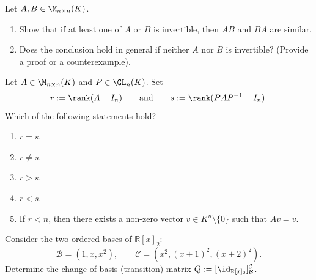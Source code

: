 \begin{exercise}
\label{exc:similarity_of_matrix_products}
Let $A, B \in \M_{n \times n}(K)$.
\begin{enumerate}
    \item Show that if at least one of $A$ or $B$ is invertible, then $AB$ and $BA$ are similar.
    \item Does the conclusion hold in general if neither $A$ nor $B$ is invertible? (Provide a proof or a counterexample).
\end{enumerate}
\end{exercise}

\begin{exercise}
\label{exc:rank_invariance_similarity_mc}
Let $A \in \M_{n \times n}(K)$ and $P \in \GL_n(K)$. Set
\[
r := \rank(A - I_n) \qquad \text{and} \qquad s := \rank(P A P^{-1} - I_n).
\]
Which of the following statements hold?
\begin{enumerate}[label=\textbf{(\alph*)}]
    \item $r = s$.
    \item $r \ne s$.
    \item $r > s$.
    \item $r < s$.
    \item If $r < n$, then there exists a non-zero vector $v \in K^n \setminus \{0\}$ such that $Av = v$.
\end{enumerate}
\end{exercise}

\begin{exercise}
\label{exc:change_of_basis_polynomials_mc}
Consider the two ordered bases of $\mathbb{R}[x]_2$:
\[
\mathcal{B} = (1, x, x^2), \qquad \mathcal{C} = \left( x^2, (x+1)^2, (x+2)^2 \right).
\]
Determine the change of basis (transition) matrix $Q := [\id_{\mathbb{R}[x]_2}]_{\mathcal{B}}^{\mathcal{C}}$.
\end{exercise}

